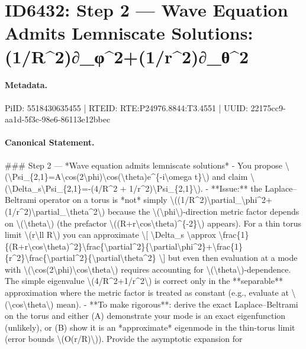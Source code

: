 \section*{ID6432: Step 2 — Wave Equation Admits Lemniscate Solutions: (1/R\textasciicircum{}2)∂\_φ\textasciicircum{}2+(1/r\textasciicircum{}2)∂\_θ\textasciicircum{}2}
\paragraph{Metadata.}
PiID: 5518430635455 | RTEID: RTE:P24976.8844:T3.4551 | UUID: 22175cc9-aa1d-5f3c-98e6-86113e12bbec

\paragraph{Canonical Statement.}
\#\#\# Step 2 — *Wave equation admits lemniscate solutions* - You propose \textbackslash{}(\textbackslash{}Psi\_\{2,1\}=A\textbackslash{}cos(2\textbackslash{}phi)\textbackslash{}cos(\textbackslash{}theta)e\textasciicircum{}\{-i\textbackslash{}omega t\}\textbackslash{}) and claim \textbackslash{}(\textbackslash{}Delta\_s\textbackslash{}Psi\_\{2,1\}=-(4/R\textasciicircum{}2 + 1/r\textasciicircum{}2)\textbackslash{}Psi\_\{2,1\}\textbackslash{}). - **Issue:** the Laplace–Beltrami operator on a torus is *not* simply \textbackslash{}((1/R\textasciicircum{}2)\textbackslash{}partial\_\textbackslash{}phi\textasciicircum{}2+(1/r\textasciicircum{}2)\textbackslash{}partial\_\textbackslash{}theta\textasciicircum{}2\textbackslash{}) because the \textbackslash{}(\textbackslash{}phi\textbackslash{})-direction metric factor depends on \textbackslash{}(\textbackslash{}theta\textbackslash{}) (the prefactor \textbackslash{}((R+r\textbackslash{}cos\textbackslash{}theta)\textasciicircum{}\{-2\}\textbackslash{}) appears). For a thin torus limit \textbackslash{}(r\textbackslash{}ll R\textbackslash{}) you can approximate \textbackslash{}[ \textbackslash{}Delta\_s \textbackslash{}approx \textbackslash{}frac\{1\}\{(R+r\textbackslash{}cos\textbackslash{}theta)\textasciicircum{}2\}\textbackslash{}frac\{\textbackslash{}partial\textasciicircum{}2\}\{\textbackslash{}partial\textbackslash{}phi\textasciicircum{}2\}+\textbackslash{}frac\{1\}\{r\textasciicircum{}2\}\textbackslash{}frac\{\textbackslash{}partial\textasciicircum{}2\}\{\textbackslash{}partial\textbackslash{}theta\textasciicircum{}2\} \textbackslash{}] but even then evaluation at a mode with \textbackslash{}(\textbackslash{}cos(2\textbackslash{}phi)\textbackslash{}cos\textbackslash{}theta\textbackslash{}) requires accounting for \textbackslash{}(\textbackslash{}theta\textbackslash{})-dependence. The simple eigenvalue \textbackslash{}(4/R\textasciicircum{}2+1/r\textasciicircum{}2\textbackslash{}) is correct only in the **separable** approximation where the metric factor is treated as constant (e.g., evaluate at \textbackslash{}(\textbackslash{}cos\textbackslash{}theta\textbackslash{}) mean). - **To make rigorous**: derive the exact Laplace–Beltrami on the torus and either (A) demonstrate your mode is an exact eigenfunction (unlikely), or (B) show it is an *approximate* eigenmode in the thin-torus limit (error bounds \textbackslash{}(O(r/R)\textbackslash{})). Provide the asymptotic expansion for 